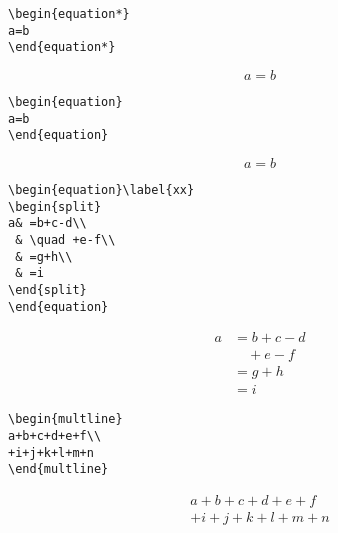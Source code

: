 \begin{table}[p]
\caption[]{
So sánh các môi trường biểu diễn phương trình (đường thẳng đứng
dùng để chỉ lề trái, phải của tờ giấy tưởng tượng)
}
\label{displays}
\renewcommand{\theequation}{\arabic{equation}}
\begin{eqxample}
\begin{verbatim}
\begin{equation*}
a=b
\end{equation*}
\end{verbatim}
\producing
\begin{equation*}
a=b
\end{equation*}
\end{eqxample}

\begin{eqxample}
\begin{verbatim}
\begin{equation}
a=b
\end{equation}
\end{verbatim}
\producing
\begin{equation}
a=b
\end{equation}
\end{eqxample}

\begin{eqxample}
\begin{verbatim}
\begin{equation}\label{xx}
\begin{split}
a& =b+c-d\\
 & \quad +e-f\\
 & =g+h\\
 & =i
\end{split}
\end{equation}
\end{verbatim}
\producing
\begin{equation}\label{xx}
\begin{split}
a& =b+c-d\\
 & \quad +e-f\\
 & =g+h\\
 & =i
\end{split}
\end{equation}
\end{eqxample}

\begin{eqxample}
\begin{verbatim}
\begin{multline}
a+b+c+d+e+f\\
+i+j+k+l+m+n
\end{multline}
\end{verbatim}
\producing
\begin{multline}
a+b+c+d+e+f\\
+i+j+k+l+m+n
\end{multline}
\end{eqxample}


\end{table}

